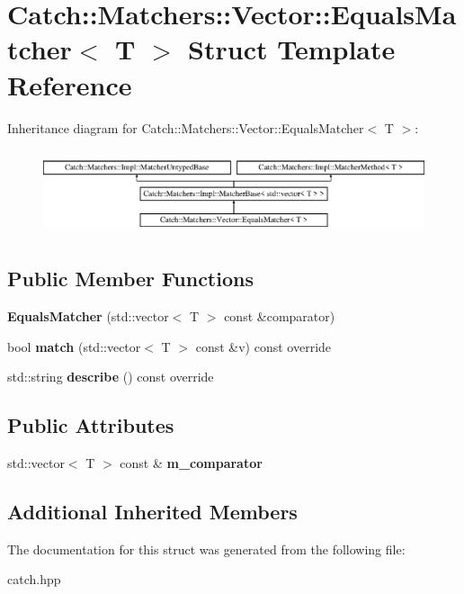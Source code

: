 \hypertarget{structCatch_1_1Matchers_1_1Vector_1_1EqualsMatcher}{}\section{Catch\+::Matchers\+::Vector\+::Equals\+Matcher$<$ T $>$ Struct Template Reference}
\label{structCatch_1_1Matchers_1_1Vector_1_1EqualsMatcher}
Inheritance diagram for Catch\+::Matchers\+::Vector\+::Equals\+Matcher$<$ T $>$\+:\begin{figure}[H]
\begin{center}
\leavevmode
\includegraphics[height=2.514970cm]{structCatch_1_1Matchers_1_1Vector_1_1EqualsMatcher}
\end{center}
\end{figure}
\subsection*{Public Member Functions}
\begin{DoxyCompactItemize}
\item 
\mbox{\label{structCatch_1_1Matchers_1_1Vector_1_1EqualsMatcher_a3846c47780d1991dcfe87aefded98008}} 
{\bfseries Equals\+Matcher} (std\+::vector$<$ T $>$ const \&comparator)
\item 
\mbox{\label{structCatch_1_1Matchers_1_1Vector_1_1EqualsMatcher_a2d96cca58a44151fddc5257eda3305da}} 
bool {\bfseries match} (std\+::vector$<$ T $>$ const \&v) const override
\item 
\mbox{\label{structCatch_1_1Matchers_1_1Vector_1_1EqualsMatcher_a36b5f7ecada4081d6c65bebe8ddea6f4}} 
std\+::string {\bfseries describe} () const override
\end{DoxyCompactItemize}
\subsection*{Public Attributes}
\begin{DoxyCompactItemize}
\item 
\mbox{\label{structCatch_1_1Matchers_1_1Vector_1_1EqualsMatcher_a56f7aa6f110a12b1b9aeb0cabbc9d755}} 
std\+::vector$<$ T $>$ const  \& {\bfseries m\+\_\+comparator}
\end{DoxyCompactItemize}
\subsection*{Additional Inherited Members}


The documentation for this struct was generated from the following file\+:\begin{DoxyCompactItemize}
\item 
catch.\+hpp\end{DoxyCompactItemize}
